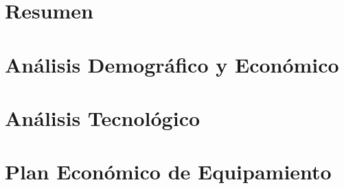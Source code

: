 \documentclass[12pt,letterpaper]{article}
\author{}
\date{}
\begin{document}



\clearpage

\setlength{\parskip}{3mm}


\part{Resumen}
	


\part{Análisis Demográfico y Económico}\label{demografico}

	
	
	\newpage

\part{Análisis Tecnológico}\label{tecnologico}
	
	
	
	
	

\part{Plan Económico de Equipamiento}\label{plan-economico}

	
	
\end{document}
